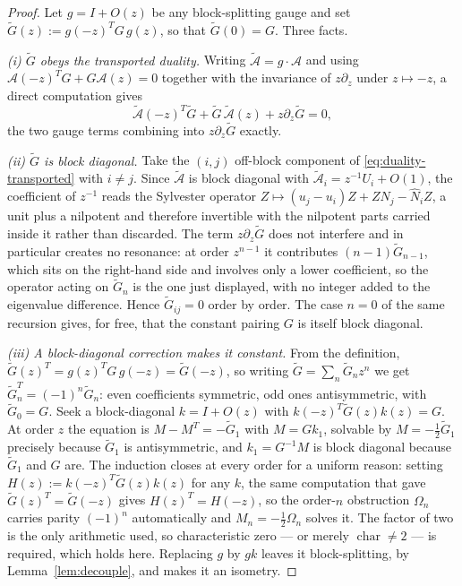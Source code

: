 \documentclass[11pt]{article}
\theoremstyle{definition}
\theoremstyle{remark}
\begin{document}
\begin{proof}
Let $g=I+O(z)$ be any block-splitting gauge and set
$\widetilde G(z):=g(-z)^TG\,g(z)$, so that $\widetilde G(0)=G$. Three facts.

\emph{(i) $\widetilde G$ obeys the transported duality.} Writing
$\widetilde{\mathcal A}=g\cdot\mathcal A$ and using
$\mathcal A(-z)^TG+G\mathcal A(z)=0$ together with the invariance of $z\partial_z$
under $z\mapsto-z$, a direct computation gives
\[
  \widetilde{\mathcal A}(-z)^T\widetilde G+\widetilde G\,\widetilde{\mathcal A}(z)
  +z\partial_z\widetilde G=0,
  \tag{8.4a}
  \label{eq:duality-transported}
\]
the two gauge terms combining into $z\partial_z\widetilde G$ exactly.

\emph{(ii) $\widetilde G$ is block diagonal.} Take the $(i,j)$ off-block component
of \eqref{eq:duality-transported} with $i\ne j$. Since
$\widetilde{\mathcal A}$ is block diagonal with
$\widetilde{\mathcal A}_i=z^{-1}U_i+O(1)$, the coefficient of $z^{-1}$ reads
the Sylvester operator
$Z\mapsto(u_j-u_i)Z+ZN_j-\widehat N_iZ$, a unit plus a nilpotent and therefore
invertible with the nilpotent parts carried inside it rather than discarded. The
term $z\partial_z\widetilde G$ does not interfere and in particular creates no
resonance: at order $z^{n-1}$ it contributes $(n-1)\widetilde G_{n-1}$, which
sits on the right-hand side and involves only a lower coefficient, so the operator
acting on $\widetilde G_n$ is the one just displayed, with no integer added to the
eigenvalue difference. Hence $\widetilde G_{ij}=0$ order by order. The case $n=0$
of the same recursion gives, for free, that the constant pairing $G$ is itself
block diagonal.

\emph{(iii) A block-diagonal correction makes it constant.} From the definition,
$\widetilde G(z)^T=g(z)^TG\,g(-z)=\widetilde G(-z)$, so writing
$\widetilde G=\sum_n\widetilde G_nz^n$ we get $\widetilde G_n^T=(-1)^n\widetilde
G_n$: even coefficients symmetric, odd ones antisymmetric, with
$\widetilde G_0=G$. Seek a block-diagonal $k=I+O(z)$ with
$k(-z)^T\widetilde G(z)k(z)=G$. At order $z$ the equation is
$M-M^T=-\widetilde G_1$ with $M=Gk_1$, solvable by $M=-\tfrac12\widetilde G_1$
precisely because $\widetilde G_1$ is antisymmetric, and $k_1=G^{-1}M$ is block
diagonal because $\widetilde G_1$ and $G$ are. The induction closes at every
order for a uniform reason: setting $H(z):=k(-z)^T\widetilde G(z)k(z)$ for any
$k$, the same computation that gave $\widetilde G(z)^T=\widetilde G(-z)$ gives
$H(z)^T=H(-z)$, so the order-$n$ obstruction $\Omega_n$ carries parity $(-1)^n$
automatically and $M_n=-\tfrac12\Omega_n$ solves it. The factor of two is the
only arithmetic used, so characteristic zero --- or merely
$\operatorname{char}\ne2$ --- is required, which holds here. Replacing $g$ by $gk$ leaves it
block-splitting, by Lemma~\ref{lem:decouple}, and makes it an isometry.


\end{proof}
\end{document}
